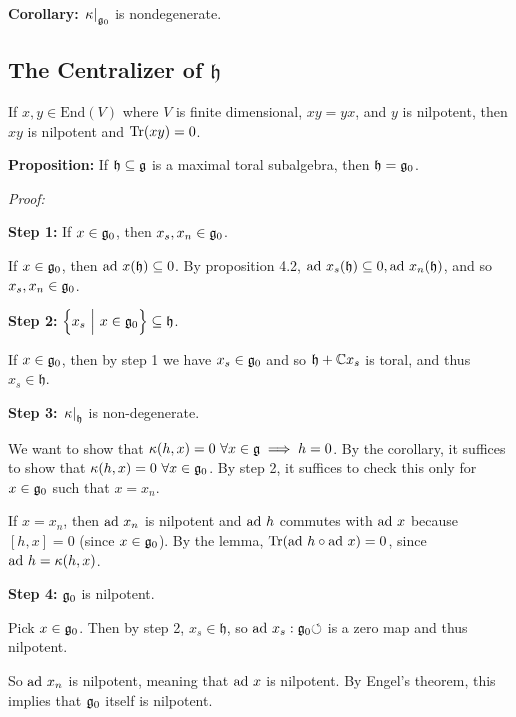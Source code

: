 \textbf{Corollary:} \({\left.{\kappa}\right|_{{\mathfrak{g}}_0}}\) is
nondegenerate.

\hypertarget{the-centralizer-of-mathfrak-h}{%
\subsection{\texorpdfstring{The Centralizer of
\(\mathfrak h\)}{The Centralizer of \textbackslash mathfrak h}}\label{the-centralizer-of-mathfrak-h}}

If \(x,y \in \mathrm{End}(V)\) where \(V\) is finite dimensional,
\(xy=yx\), and \(y\) is nilpotent, then \(xy\) is nilpotent and
\(\mathrm{Tr}(xy)=0\).

\textbf{Proposition:} If \(\mathfrak h\subseteq {\mathfrak{g}}\) is a maximal
toral subalgebra, then \(\mathfrak h = {\mathfrak{g}}_0\).

\emph{Proof:}

\textbf{Step 1:} If \(x\in {\mathfrak{g}}_0\), then \(x_s, x_n \in {\mathfrak{g}}_0\).

If \(x\in{\mathfrak{g}}_0\), then \(\mathrm{ad}~ x(\mathfrak h) \subseteq 0\). By
proposition 4.2,
\(\mathrm{ad}~ x_s(\mathfrak h) \subseteq 0, \mathrm{ad}~ x_n(\mathfrak h)\), and so
\(x_s, x_n \in {\mathfrak{g}}_0\).

\textbf{Step 2:}
\(\left\{{x_s {~\mathrel{\Big|}~} x\in{\mathfrak{g}}_0}\right\} \subseteq \mathfrak h\).

If \(x\in {\mathfrak{g}}_0\), then by step 1 we have \(x_s \in {\mathfrak{g}}_0\) and so
\(\mathfrak h + {\mathbb{C}} x_s\) is toral, and thus \(x_s \in \mathfrak h\).

\textbf{Step 3:} \({\left.{\kappa}\right|_{\mathfrak h}}\) is
non-degenerate.

We want to show that
\(\kappa(h, x) = 0 ~\forall x\in{\mathfrak{g}} \implies h = 0\). By the
corollary, it suffices to show that
\(\kappa(h, x) = 0 ~\forall x\in {\mathfrak{g}}_0\). By step 2, it suffices to
check this only for \(x\in {\mathfrak{g}}_0\) such that \(x=x_n\).

If \(x=x_n\), then \(\mathrm{ad}~ x_n\) is nilpotent and \(\mathrm{ad}~ h\) commutes with
\(\mathrm{ad}~ x\) because \([h, x] = 0\) (since \(x\in {\mathfrak{g}}_0\)). By the lemma,
\(\mathrm{Tr}(\mathrm{ad}~ h \circ \mathrm{ad}~ x) = 0\), since \(\mathrm{ad}~ h = \kappa(h, x)\).

\textbf{Step 4:} \({\mathfrak{g}}_0\) is nilpotent.

Pick \(x\in {\mathfrak{g}}_0\). Then by step 2, \(x_s \in \mathfrak h\), so
\(\mathrm{ad}~ x_s: {\mathfrak{g}}_0 {\circlearrowleft}\) is a zero map and thus nilpotent.

So \(\mathrm{ad}~ x_n\) is nilpotent, meaning that \(\mathrm{ad}~ x\) is nilpotent. By
Engel's theorem, this implies that \({\mathfrak{g}}_0\) itself is nilpotent.

